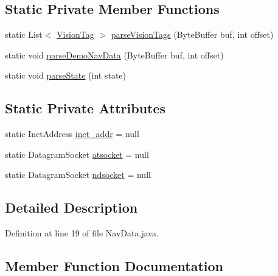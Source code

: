 \subsection*{Static Private Member Functions}
\begin{DoxyCompactItemize}
\item 
static List$<$ \hyperlink{classworkspace_1_1_a_r_drone_nav_data_1_1src_1_1controller_1_1_vision_tag}{Vision\+Tag} $>$ \hyperlink{classworkspace_1_1_a_r_drone_nav_data_1_1src_1_1_nav_data_a7644e4b560209b4b0c2cb96084970acd}{parse\+Vision\+Tags} (Byte\+Buffer buf, int offset)
\item 
static void \hyperlink{classworkspace_1_1_a_r_drone_nav_data_1_1src_1_1_nav_data_a5bf3b738d8cfc76f9e52de7d13c613cf}{parse\+Demo\+Nav\+Data} (Byte\+Buffer buf, int offset)
\item 
static void \hyperlink{classworkspace_1_1_a_r_drone_nav_data_1_1src_1_1_nav_data_a04bb01769095229cedcb09337267d76b}{parse\+State} (int state)
\end{DoxyCompactItemize}
\subsection*{Static Private Attributes}
\begin{DoxyCompactItemize}
\item 
static Inet\+Address \hyperlink{classworkspace_1_1_a_r_drone_nav_data_1_1src_1_1_nav_data_a822661933201f8b0c1c6da6919b62b81}{inet\+\_\+addr} = null
\item 
static Datagram\+Socket \hyperlink{classworkspace_1_1_a_r_drone_nav_data_1_1src_1_1_nav_data_a06573f3f3fcbeb54e9d5d087410117ac}{atsocket} = null
\item 
static Datagram\+Socket \hyperlink{classworkspace_1_1_a_r_drone_nav_data_1_1src_1_1_nav_data_acd9de63f69b79f1313078311d7725cda}{ndsocket} = null
\end{DoxyCompactItemize}


\subsection{Detailed Description}


Definition at line 19 of file Nav\+Data.\+java.



\subsection{Member Function Documentation}
\hypertarget{classworkspace_1_1_a_r_drone_nav_data_1_1src_1_1_nav_data_a48f7de7994b48a30f09910e9971d300d}{}
